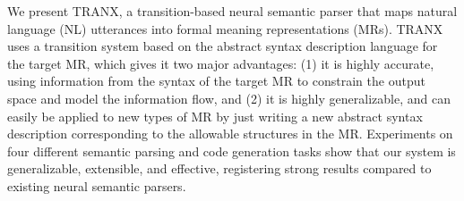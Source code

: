 We present TRANX, a transition-based neural semantic parser that maps natural language (NL) utterances into formal meaning representations (MRs). TRANX uses a transition system based on the abstract syntax description language for the target MR, which gives it two major advantages: (1) it is highly accurate, using information from the syntax of the target MR to constrain the output space and model the information flow, and (2) it is highly generalizable, and can easily be applied to new types of MR by just writing a new abstract syntax description corresponding to the allowable structures in the MR. Experiments on four different semantic parsing and code generation tasks show that our system is generalizable, extensible, and effective, registering strong results compared to existing neural semantic parsers.
